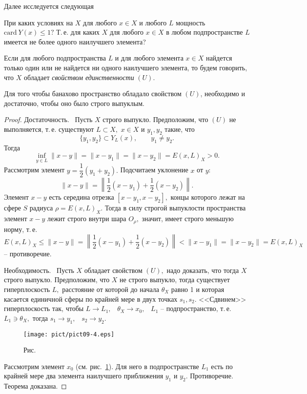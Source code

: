 Далее исследуется следующая

 \task %
 При каких условиях на $X$ для любого $x\in X$ и любого $L$
 мощность $\mbox{card}\ Y(x)\le 1?$ Т.\,е. для каких $X$
 для любого $x\in X$ в любом подпространстве $L$
 имеется не более одного наилучшего элемента?

\begin{defi}
 Если для любого подпространства $L$ и для любого элемента $x\in X$
 найдется только один или {не найдется} ни одного наилучшего элемента, то будем
 говорить, что $X$ обладает {\it свойством единственности} $(U).$
 \end{defi}

 \begin{teo} %
 Для того чтобы банахово пространство обладало свойством $(U)$,
 необходимо и достаточно, чтобы оно было строго выпуклым.
 \end{teo}

 \begin{proof} %
 Д\;о\;с\;т\;а\;т\;о\;ч\;н\;о\;с\;т\;ь.~ Пусть $X$ строго выпукло. Предположим, что
 $(U)$ не выполняется, т.\,е. существуют $L\subset X,$ $x\in
 X$ и $y_1,y_2$ такие, что
 $$
 \{y_1,y_2\}\subset Y_L(x),\qquad y_1\ne y_2.
 $$
 Тогда
 $$
 \inf_{y\in L} \|x-y\|=\|x-y_1\|=\|x-y_2\|=E(x,L)_X>0.
 $$
 Рассмотрим элемент $y=\dfrac{1}{2}(y_1+y_2).$ Подсчитаем уклонение $x$
 от $y$:
 $$
 \|x-y\|=\left\| \frac{1}{2} (x-y_1)+\frac{1}{2}(x-y_2) \right\|.
 $$
 Элемент $x-y$ есть середина отрезка $[x-y_1,x-y_2],$ концы
 которого лежат на сфере $S$ радиуса $\rho=E(x,L)_X.$
 Тогда в силу строгой выпуклости пространства элемент $x-y$
 лежит строго внутри шара ${O}_{\rho},$ значит, имеет строго меньшую норму, т.\,е.
 $$
 E(x,L)_X \le \|x-y\|=\left\| \frac{1}{2}(x-y_1)+\frac{1}{2}(x-y_2)
 \right\|<\|x-y_1\|=\|x-y_2\|=E(x,L)_X
 $$
 -- противоречие.



 {Н\;е\;о\;б\;х\;о\;д\;и\;м\;о\;с\;т\;ь.}~ Пусть $X$ обладает свойством $(U),$
 надо доказать, что тогда $X$ строго выпукло. Предположим, что $X$
 не строго выпукло, тогда существует гиперплоскость $L,$
 расстояние от которой до {начала} $\theta_X$ равно 1 и которая
 касается единичной сферы по крайней мере в двух точках $s_1,s_2.$
 <<Сдвинем>> гиперплоскость так, чтобы $L\to L_1,$~ $\theta_X\to x_0,$~ $L_1$
 -- подпространство, т.\,е. $L_1\ni \theta_X,$ тогда $s_1\to y_1,$~ $s_2\to y_2.$

 \bigskip
\begin{figure}[ht]
\begin{center}
\texttt{[image: pict/pict09-4.eps]}
\end{center}
 \bigskip
 \label{r9-4}

 \centerline{Рис.~\theris}
 \bigskip
\end{figure}


 Рассмотрим элемент $x_0$ (см. рис.~\ref{r9-4}). Для него в подпространстве $L_1$
 есть по крайней мере два элемента наилучшего  приближения $y_1$
 и $y_2.$ Противоречие. Теорема доказана.
 \end{proof}

